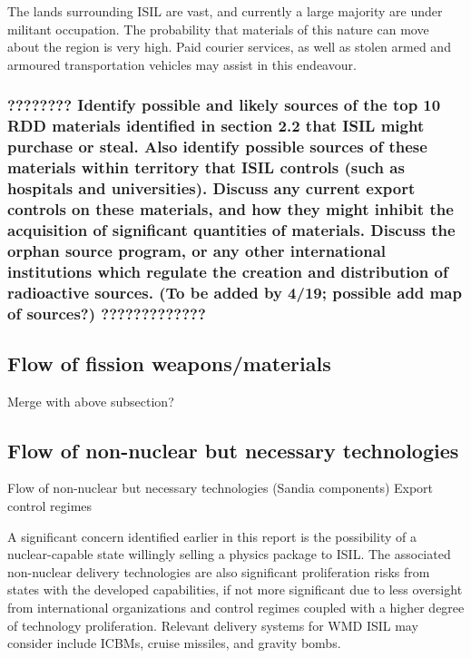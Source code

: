 \documentclass{report}
\begin{document}
The lands surrounding ISIL are vast, and currently a large majority are under militant occupation.  The probability that materials of this nature can move about the region is very high.  Paid courier services, as well as stolen armed and armoured transportation vehicles  may assist in this endeavour.

\subsubsection{???????? Identify possible and likely sources of the top 10 RDD materials identified in section 2.2 that ISIL might purchase or steal. Also identify possible sources of these materials within territory that ISIL controls (such as hospitals and universities). Discuss any current export controls on these materials, and how they might inhibit the acquisition of significant quantities of materials. Discuss the orphan source program, or any other international institutions which regulate the creation and distribution of radioactive sources. (To be added by 4/19; possible add map of sources?) ?????????????} 
 
 \subsection{Flow of fission weapons/materials}

Merge with above subsection?


\subsection{Flow of non-nuclear but necessary technologies}

Flow of non-nuclear but necessary technologies (Sandia components)
Export control regimes

A significant concern identified earlier in this report is the possibility of a nuclear-capable state willingly selling a physics package to ISIL. The associated non-nuclear delivery technologies are also significant proliferation risks from states with the developed capabilities, if not more significant due to less oversight from international organizations and control regimes coupled with a higher degree of technology proliferation. Relevant delivery systems for WMD ISIL may consider include ICBMs, cruise missiles, and gravity bombs. 
\end{document}
